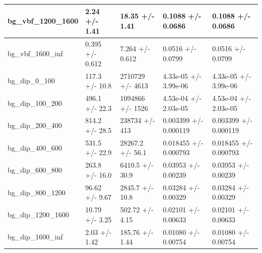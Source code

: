 \documentclass[a4paper, 10pt]{article}
\begin{document}
\begin{table}[H]
\begin{center}
\begin{tabular}{|m{20.0mm}|m{27.0mm}|m{27.0mm}|m{33.0mm}|m{32.0mm}|}
      \hline
      {\cellcolor{white}         bg\_vbf\_1200\_1600}& {\cellcolor{white}         2.24 +/\-- 1.41}& {\cellcolor{white}         18.35 +/\-- 1.41}& {\cellcolor{white}         0.1088 +/\-- 0.0686}& {\cellcolor{white}         0.1088 +/\-- 0.0686}\\
      \hline
      {\cellcolor{white}         bg\_vbf\_1600\_inf}& {\cellcolor{white}         0.395 +/\-- 0.612}& {\cellcolor{white}         7.264 +/\-- 0.612}& {\cellcolor{white}         0.0516 +/\-- 0.0799}& {\cellcolor{white}         0.0516 +/\-- 0.0799}\\
      \hline
      {\cellcolor{white}         bg\_dip\_0\_100}& {\cellcolor{white}         117.3 +/\-- 10.8}& {\cellcolor{white}         2710729 +/\-- 4613}& {\cellcolor{white}         4.33e-05 +/\-- 3.99e-06}& {\cellcolor{white}         4.33e-05 +/\-- 3.99e-06}\\
      \hline
      {\cellcolor{white}         bg\_dip\_100\_200}& {\cellcolor{white}         496.1 +/\-- 22.3}& {\cellcolor{white}         1094866 +/\-- 1526}& {\cellcolor{white}         4.53e-04 +/\-- 2.03e-05}& {\cellcolor{white}         4.53e-04 +/\-- 2.03e-05}\\
      \hline
      {\cellcolor{white}         bg\_dip\_200\_400}& {\cellcolor{white}         814.2 +/\-- 28.5}& {\cellcolor{white}         238734 +/\-- 413}& {\cellcolor{white}         0.003399 +/\-- 0.000119}& {\cellcolor{white}         0.003399 +/\-- 0.000119}\\
      \hline
      {\cellcolor{white}         bg\_dip\_400\_600}& {\cellcolor{white}         531.5 +/\-- 22.9}& {\cellcolor{white}         28267.2 +/\-- 56.1}& {\cellcolor{white}         0.018455 +/\-- 0.000793}& {\cellcolor{white}         0.018455 +/\-- 0.000793}\\
      \hline
      {\cellcolor{white}         bg\_dip\_600\_800}& {\cellcolor{white}         263.8 +/\-- 16.0}& {\cellcolor{white}         6410.5 +/\-- 30.9}& {\cellcolor{white}         0.03953 +/\-- 0.00239}& {\cellcolor{white}         0.03953 +/\-- 0.00239}\\
      \hline
      {\cellcolor{white}         bg\_dip\_800\_1200}& {\cellcolor{white}         96.62 +/\-- 9.67}& {\cellcolor{white}         2845.7 +/\-- 10.8}& {\cellcolor{white}         0.03284 +/\-- 0.00329}& {\cellcolor{white}         0.03284 +/\-- 0.00329}\\
      \hline
      {\cellcolor{white}         bg\_dip\_1200\_1600}& {\cellcolor{white}         10.79 +/\-- 3.25}& {\cellcolor{white}         502.72 +/\-- 4.15}& {\cellcolor{white}         0.02101 +/\-- 0.00633}& {\cellcolor{white}         0.02101 +/\-- 0.00633}\\
      \hline
      {\cellcolor{white}         bg\_dip\_1600\_inf}& {\cellcolor{white}         2.03 +/\-- 1.42}& {\cellcolor{white}         185.76 +/\-- 1.44}& {\cellcolor{white}         0.01080 +/\-- 0.00754}& {\cellcolor{white}         0.01080 +/\-- 0.00754}\\
\hline
    \end{tabular}
  \end{center}
\end{table}
\end{document}
